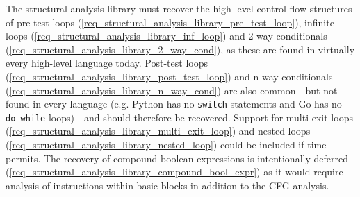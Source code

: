 \documentclass[12pt, a4paper]{article}
\begin{document}
The structural analysis library must recover the high-level control flow structures of pre-test loops (\ref{req_structural_analysis_library_pre_test_loop}), infinite loops (\ref{req_structural_analysis_library_inf_loop}) and 2-way conditionals (\ref{req_structural_analysis_library_2_way_cond}), as these are found in virtually every high-level language today. Post-test loops (\ref{req_structural_analysis_library_post_test_loop}) and n-way conditionals (\ref{req_structural_analysis_library_n_way_cond}) are also common - but not found in every language (e.g. Python has no \texttt{switch} statements and Go has no \texttt{do-while} loops) - and should therefore be recovered. Support for multi-exit loops (\ref{req_structural_analysis_library_multi_exit_loop}) and nested loops (\ref{req_structural_analysis_library_nested_loop}) could be included if time permits. The recovery of compound boolean expressions is intentionally deferred (\ref{req_structural_analysis_library_compound_bool_expr}) as it would require analysis of instructions within basic blocks in addition to the CFG analysis.
\end{document}
